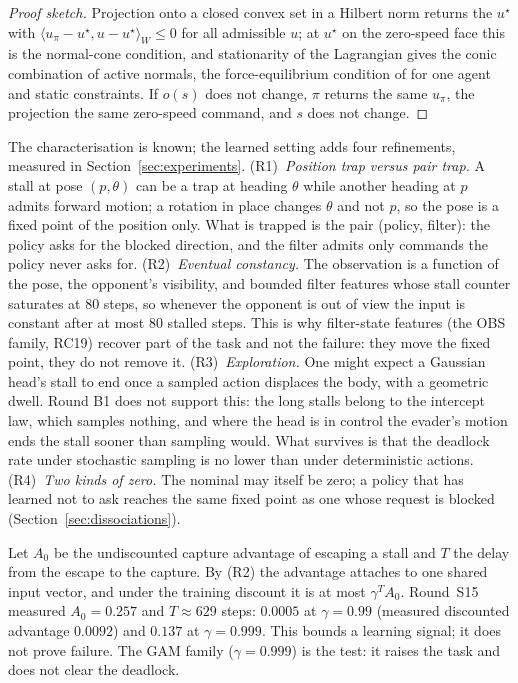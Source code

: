 \documentclass{l4dc2027}
\begin{document}
\begin{proof}[Proof sketch]
Projection onto a closed convex set in a Hilbert norm returns the $u^\star$ with $\langle u_\pi - u^\star, u - u^\star\rangle_W \le 0$ for all admissible $u$; at $u^\star$ on the zero-speed face this is the normal-cone condition, and stationarity of the Lagrangian gives the conic combination of active normals, the force-equilibrium condition of \citet{grover2023before} for one agent and static constraints. If $o(s)$ does not change, $\pi$ returns the same $u_\pi$, the projection the same zero-speed command, and $s$ does not change.
\end{proof}

The characterisation is known; the learned setting adds four refinements, measured in Section~\ref{sec:experiments}. (R1)~\emph{Position trap versus pair trap.} A stall at pose $(p,\theta)$ can be a trap at heading $\theta$ while another heading at $p$ admits forward motion; a rotation in place changes $\theta$ and not $p$, so the pose is a fixed point of the position only. What is trapped is the pair (policy, filter): the policy asks for the blocked direction, and the filter admits only commands the policy never asks for. (R2)~\emph{Eventual constancy.} The observation is a function of the pose, the opponent's visibility, and bounded filter features whose stall counter saturates at 80 steps, so whenever the opponent is out of view the input is constant after at most 80 stalled steps. This is why filter-state features (the OBS family, RC19) recover part of the task and not the failure: they move the fixed point, they do not remove it. (R3)~\emph{Exploration.} One might expect a Gaussian head's stall to end once a sampled action displaces the body, with a geometric dwell. Round B1 does not support this: the long stalls belong to the intercept law, which samples nothing, and where the head is in control the evader's motion ends the stall sooner than sampling would. What survives is that the deadlock rate under stochastic sampling is no lower than under deterministic actions. (R4)~\emph{Two kinds of zero.} The nominal may itself be zero; a policy that has learned not to ask reaches the same fixed point as one whose request is blocked (Section~\ref{sec:dissociations}).

\begin{remark}\label{rem:discount}
Let $A_0$ be the undiscounted capture advantage of escaping a stall and $T$ the delay from the escape to the capture. By (R2) the advantage attaches to one shared input vector, and under the training discount it is at most $\gamma^{T} A_0$. Round~S15 measured $A_0 = 0.257$ and $T \approx 629$ steps: $0.0005$ at $\gamma = 0.99$ (measured discounted advantage $0.0092$) and $0.137$ at $\gamma = 0.999$. This bounds a learning signal; it does not prove failure. The GAM family ($\gamma = 0.999$) is the test: it raises the task and does not clear the deadlock.
\end{remark}
\end{document}
